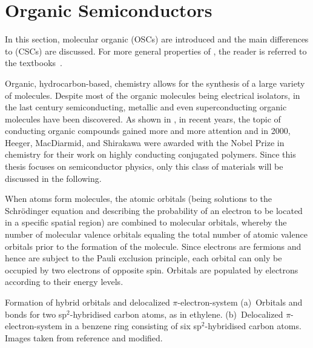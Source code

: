 
\newpage
\section{Organic Semiconductors}\label{sec:TheoOrganicSemiconductors}
In this section, molecular organic \SCs (OSCs) are introduced and the main differences to \CSCs (CSCs) are discussed. For more general properties of \OSCs, the reader is referred to the textbooks~\cite{PopeSwenberg,SchwoererWolf}.

Organic, \ie hydrocarbon-based, chemistry allows for the synthesis of a large variety of molecules. Despite most of the organic molecules being electrical isolators, in the last century semiconducting\cite{Bolto1963}, metallic\cite{Ferraris1973,Coleman1973} and even superconducting\cite{Jerome1980} organic molecules have been discovered.
As shown in , in recent years, the topic of conducting organic compounds gained more and more attention and in 2000, Heeger, MacDiarmid, and Shirakawa were awarded with the Nobel Prize in chemistry for their work on highly conducting conjugated polymers\cite{NobelChem2000}.
Since this thesis focuses on semiconductor physics, only this class of materials will be discussed in the following.

When atoms form molecules, the atomic orbitals (being solutions to the Schrödinger %
equation and describing the probability of an electron to be located in a specific spatial region) are combined to molecular orbitals, whereby the number of molecular valence orbitals equaling the total number of atomic valence orbitals prior to the formation of the molecule.
Since electrons are fermions and hence are subject to the Pauli exclusion principle, each orbital can only be occupied by two electrons of opposite spin.
Orbitals are populated by electrons according to their energy levels.

%
{Formation of hybrid orbitals and delocalized $\pi$-electron-system}%
{%
(a)~Orbitals and bonds for two sp$^2$-hybridised carbon atoms, as in ethylene.
(b)~Delocalized $\pi$-electron-system in a benzene ring consisting of six sp$^2$-hybridised carbon atoms. Images taken from reference\cite{OW} and modified.
}%

